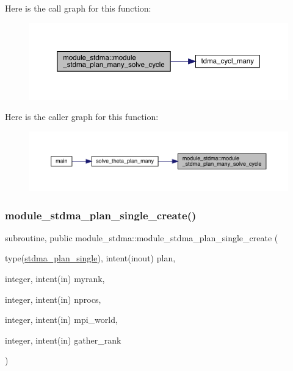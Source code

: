 Here is the call graph for this function\+:\nopagebreak
\begin{figure}[H]
\begin{center}
\leavevmode
\includegraphics[width=350pt]{namespacemodule__stdma_ab9a4a74a41d0b04823b5ac26f58a9733_cgraph}
\end{center}
\end{figure}
Here is the caller graph for this function\+:\nopagebreak
\begin{figure}[H]
\begin{center}
\leavevmode
\includegraphics[width=350pt]{namespacemodule__stdma_ab9a4a74a41d0b04823b5ac26f58a9733_icgraph}
\end{center}
\end{figure}
\mbox{\label{namespacemodule__stdma_af1e75db96d40d895493a1d46fd1d044b}} 
\subsubsection{\texorpdfstring{module\_stdma\_plan\_single\_create()}{module\_stdma\_plan\_single\_create()}}
{\footnotesize\ttfamily subroutine, public module\+\_\+stdma\+::module\+\_\+stdma\+\_\+plan\+\_\+single\+\_\+create (\begin{DoxyParamCaption}\item[{type(\mbox{\hyperlink{structmodule__stdma_1_1stdma__plan__single}{stdma\+\_\+plan\+\_\+single}}), intent(inout)}]{plan,  }\item[{integer, intent(in)}]{myrank,  }\item[{integer, intent(in)}]{nprocs,  }\item[{integer, intent(in)}]{mpi\+\_\+world,  }\item[{integer, intent(in)}]{gather\+\_\+rank }\end{DoxyParamCaption})}



